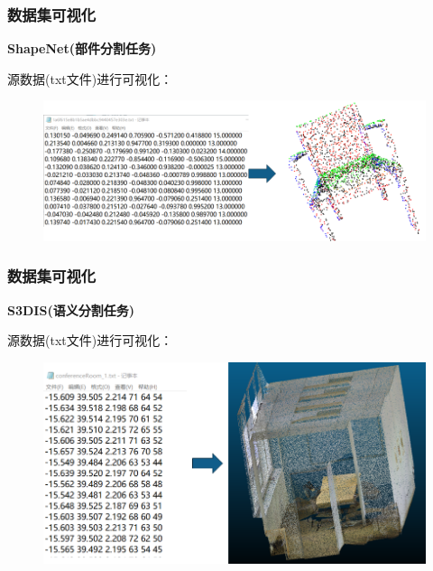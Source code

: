 \begin{frame}
  \frametitle{数据集可视化}

\textbf{ShapeNet(部件分割任务)}

源数据(txt文件)进行可视化：


\begin{figure}
\includegraphics[scale=0.35]{doc/img/f5.png}
\end{figure}


\end{frame}


\begin{frame}
  \frametitle{数据集可视化}

\textbf{S3DIS(语义分割任务)}

源数据(txt文件)进行可视化：


\begin{figure}
\includegraphics[scale=0.3]{doc/img/f6.png}
\end{figure}


\end{frame}


